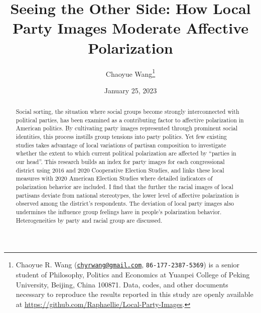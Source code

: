 \documentclass[
  12pt,
]{article}
\title{\textbf{Seeing the Other Side: How Local Party Images Moderate
Affective Polarization}}
\author{Chaoyue Wang\footnote{Chaoyue R. Wang
  (\href{mailto:chyrwang@gmail.com}{\nolinkurl{chyrwang@gmail.com}},
  \texttt{86-177-2387-5369}) is a senior student of Philosophy, Politics
  and Economics at Yuanpei College of Peking University, Beijing, China
  100871. Data, codes, and other documents necessary to reproduce the
  results reported in this study are openly available at
  \url{https://github.com/Raphaellie/Local-Party-Images}.}}
\date{January 25, 2023}
\begin{document}

\maketitle


\thispagestyle{empty}

\begin{abstract}
\noindent %
Social sorting, the situation where social groups become strongly
interconnected with political parties, has been examined as a
contributing factor to affective polarization in American politics. By
cultivating party images represented through prominent social
identities, this process instills group tensions into party politics.
Yet few existing studies takes advantage of local variations of partisan
composition to investigate whether the extent to which current political
polarization are affected by ``parties in our head''. This research
builds an index for party images for each congressional district using
2016 and 2020 Cooperative Election Studies, and links these local
measures with 2020 American Election Studies where detailed indicators
of polarization behavior are included. I find that the further the
racial images of local partisans deviate from national stereotypes, the
lower level of affective polarization is observed among the district's
respondents. The deviation of local party images also undermines the
influence group feelings have in people's polarization behavior.
Heterogeneities by party and racial group are discussed.
\end{abstract}

\begin{quote}
\end{quote}

\newpage \clearpage {}\captionsetup{labelfont = bf, font = small}




\ifdefined\Shaded\renewenvironment{Shaded}{\begin{tcolorbox}[frame hidden, interior hidden, boxrule=0pt, breakable, sharp corners, enhanced, borderline west={3pt}{0pt}{shadecolor}]}{\end{tcolorbox}}\fi
\end{document}
